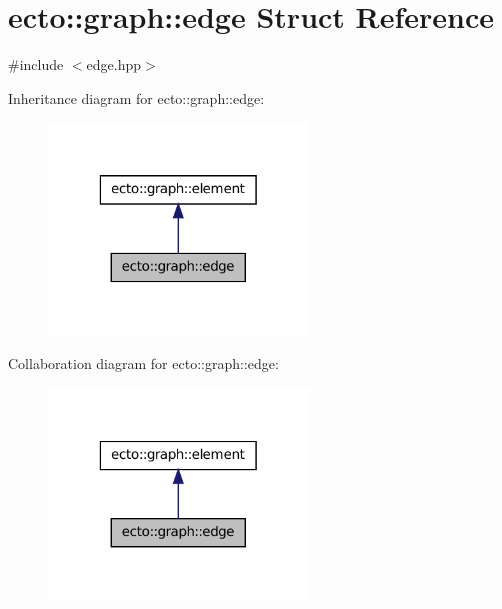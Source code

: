 \hypertarget{structecto_1_1graph_1_1edge}{\section{ecto\-:\-:graph\-:\-:edge \-Struct \-Reference}
\label{structecto_1_1graph_1_1edge}
}


{\ttfamily \#include $<$edge.\-hpp$>$}



\-Inheritance diagram for ecto\-:\-:graph\-:\-:edge\-:\nopagebreak
\begin{figure}[H]
\begin{center}
\leavevmode
\includegraphics[width=196pt]{structecto_1_1graph_1_1edge__inherit__graph}
\end{center}
\end{figure}


\-Collaboration diagram for ecto\-:\-:graph\-:\-:edge\-:\nopagebreak
\begin{figure}[H]
\begin{center}
\leavevmode
\includegraphics[width=196pt]{structecto_1_1graph_1_1edge__coll__graph}
\end{center}
\end{figure}
